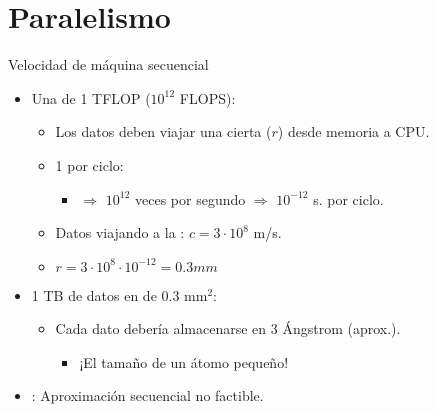 \section{Paralelismo}

\begin{frame}[t]{Velocidad de máquina secuencial}
\begin{itemize}
  \item Una  de 1 TFLOP ($10^{12}$ FLOPS):
    \begin{itemize}
      \item Los datos deben viajar una cierta  ($r$) desde memoria a CPU.
      \item 1  por ciclo:
        \begin{itemize}
          \item $\Rightarrow$ $10^{12}$ veces por segundo $\Rightarrow$ $10^{-12}$ s. por ciclo.
        \end{itemize}
      \item Datos viajando a la : $c=3 \cdot 10^8$ m/s.
      \item $r = 3 \cdot 10^8 \cdot 10^{-12} = 0.3 mm$
    \end{itemize}

  \item 1 TB de datos en  de 0.3 mm$^2$:
    \begin{itemize}
      \item Cada dato debería almacenarse en 3 Ángstrom (aprox.).
        \begin{itemize}
          \item ¡El tamaño de un átomo pequeño!
        \end{itemize}
    \end{itemize}

  \item {}: Aproximación secuencial no factible.
\end{itemize}
\end{frame}

